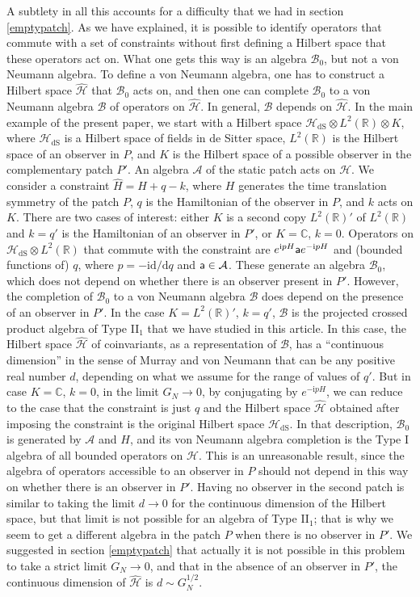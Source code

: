 \documentclass[11pt,a4paper]{article}
\def\a{{\sf a}}
\def\h{\widehat}
\def\A{{\mathcal A}}
\def\d{{\mathrm d}}
\def\R{{\mathbb R}}
\def\C{{\mathbb C}}
\def\h{\widehat}
\def\B{{\mathcal B}}
\def\H{{\mathcal H}}
\def\dS{{\mathrm{dS}}}
\def\i{{\mathrm i}}
\begin{document}
A subtlety in all this accounts for a difficulty that we had in section \ref{emptypatch}.   As we have explained, it is possible to
identify operators that commute with a set of constraints without first defining a Hilbert space that these operators act on.
What one gets this way is an algebra $\B_0$, but not a von Neumann algebra.   To define a von Neumann algebra, one has to construct a Hilbert space $\h\H$ that $\B_0$
acts on, and then one can complete $\B_0$ to a von Neumann algebra $\B$ of operators on $\h\H$.   In general,  $\B$  depends on $\h\H$.
In the main example of the present paper, we start with a Hilbert space $\H_\dS\otimes L^2(\R)\otimes K$, where $\H_\dS$ is a Hilbert space of fields in de Sitter space,
$L^2(\R)$ is the Hilbert space of an observer in $P$, and $K$ is the Hilbert space of a possible observer in the complementary patch $P'$.   
An algebra $\A$ of the static patch acts on $\H$.
 We consider a constraint $\h H=H+q-k $, where $H$ generates the time translation symmetry of the patch $P$, $q$ is the Hamiltonian of the observer in $P$, and $k$ acts on $K$.  
There are two cases of interest:
either $K$ is a second copy $L^2(\R)'$ of $L^2(\R)$ and $k=q'$ is the Hamiltonian of an observer in $P'$, or $K=\C$, $k=0$.
 Operators on $\H_\dS\otimes L^2(\R)$ 
that commute with the constraint are $e^{\i p H}\a e^{-\i p H}$ and (bounded functions of) 
$q$, where $p=-\i \d/\d q$ and $\a\in\A$.   These generate an algebra $\B_0$, which does not depend on whether there is an observer present in $P'$.
However, the completion of $\B_0$ to a von Neumann algebra $\B$ does depend on the presence of an observer in $P'$.   In the case $K=L^2(\R)'$, $k=q'$,
$\B$ is the projected
crossed product algebra of Type II$_1$ that we have studied in this article.    In this case, the Hilbert space $\h\H$ of coinvariants, as a representation of $\B$,
has a ``continuous dimension'' in the sense of Murray and von Neumann that can be any positive real number $d$, depending on what we assume for the range of values of $q'$.   But in case $K=\C$, $k=0$, in the limit $G_N\to 0$, by conjugating by $e^{-\i p H}$, we can reduce to the case that the constraint is just $q$ and the Hilbert space
$\h\H$ obtained after imposing the constraint is the original Hilbert space $\H_\dS$.   In that description, $\B_0$ is generated by $\A$ and $H$, and its von Neumann
algebra completion is the Type I algebra of all bounded operators on $\H$.   This is an unreasonable result, since  the algebra of 
operators accessible to an observer in $P$ should not depend
in this way on whether there is an observer in $P'$. Having no observer in the second patch is similar to taking the limit $d\to 0$ for the continuous dimension
of the Hilbert space, but that limit is not possible for an algebra of Type II$_1$; that is why we seem to get a different algebra in the patch $P$ when there is no
observer in $P'$.   We suggested in section \ref{emptypatch} that actually it is not possible in this problem to take a strict limit $G_N\to 0$, and
that  in the absence of an observer in $P'$, the continuous dimension of $\h\H$ is $d\sim G_N^{1/2}$.
\end{document}

